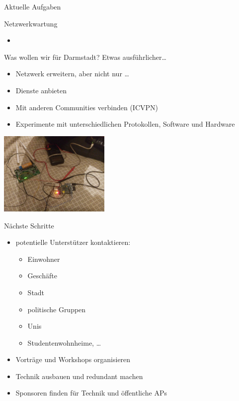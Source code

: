 \documentclass[handout]{beamer}
\begin{document}
\begin{frame}{Aktuelle Aufgaben}
	\begin{center}
		\large Netzwerkwartung
		\vfill
	\end{center}
	
	\begin{itemize}[<+->]
		\item 
	\end{itemize}	
\end{frame}		

\begin{frame}{Was wollen wir für Darmstadt?}
\vfill
Etwas ausführlicher\ldots
\begin{itemize}
\pause\item Netzwerk erweitern\pause, aber nicht nur \ldots
\pause\item Dienste anbieten
\pause\item Mit anderen Communities verbinden (ICVPN)
\pause\item Experimente mit unterschiedlichen Protokollen, Software und Hardware
\end{itemize}
\begin{center}
\vfill
\includegraphics[width=0.4\textwidth]{images/disassemble}
\end{center}
\vfill
\end{frame}

\begin{frame}{Nächste Schritte}
\vfill
\begin{itemize}
\pause\item potentielle Unterstützer kontaktieren:
	\begin{itemize}
		\pause\item Einwohner
		\pause\item Geschäfte
		\pause\item Stadt
		\pause\item politische Gruppen
		\pause\item Unis
		\pause\item Studentenwohnheime, \ldots
	\end{itemize}
\pause\item Vorträge und Workshops organisieren
\pause\item Technik ausbauen und redundant machen
\pause\item Sponsoren finden für Technik und öffentliche APs
\end{itemize}
\vfill
\end{frame}
\end{document}
